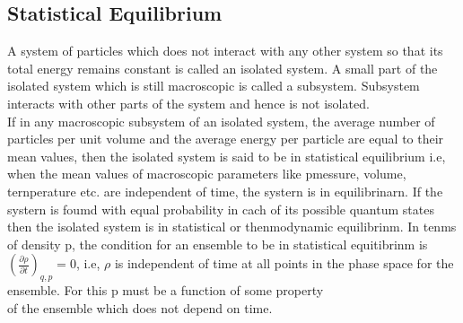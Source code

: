 \subsection{Statistical Equilibrium}
A system of particles which does not interact with any other system so that its total energy remains constant is called an isolated system. A small part of the isolated system which is still macroscopic is called a subsystem. Subsystem interacts with other parts of the system and hence is not isolated.\\
If in any macroscopic subsystem of an isolated system, the average number of particles per unit volume and the average energy per particle are equal to their mean values, then the isolated system is said to be in statistical equilibrium i.e, when the mean values of macroscopic parameters like pmessure, volume, ternperature etc. are independent of time, the systern is in equilibrinarn. If the systern is foumd with equal probability in cach of its possible quantum states then the isolated system is in statistical or thenmodynamic equilibrinm. In tenms of density p, the condition for an ensemble to be in statistical equitibrinm is $\left(\frac{\partial \rho}{\partial t}\right)_{q, p}=0$, i.e, $\rho$ is independent of time at all points in the phase space for the ensemble. For this p must be a function of some property\\
of the ensemble which does not depend on time.
